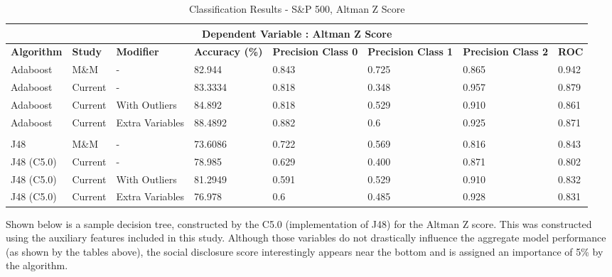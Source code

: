 \begin{table}[h]
\centering
\begin{sideways}%
\begin{tabular}{ |p{2.2cm}|p{1.55cm}|p{2.8cm}||p{2cm}|p{2cm}|p{2cm}|p{2cm}|p{1cm}|  }
 \hline
 \multicolumn{8}{|c|}{\bf Dependent Variable : Altman Z Score} \\
 \hline
{\bf Algorithm} & {\bf Study} & {\bf Modifier} & {\bf Accuracy (\%)} & {\bf Precision Class 0} & {\bf Precision Class 1} &{\bf  Precision Class 2} & {\bf ROC} \\
 \hline
  Adaboost  & M\&M  & - &  82.944     & 0.843 &  0.725 & 0.865 & 0.942  \\
  \rowcolor{gray}Adaboost & Current & - & 83.3334 & 0.818 & 0.348  & 0.957 & 0.879  \\
  Adaboost & Current & With Outliers & 84.892 & 0.818 & 0.529  & 0.910  & 0.861  \\
  \rowcolor{gray}Adaboost & Current & Extra Variables & 88.4892 & 0.882 & 0.6  & 0.925  & 0.871  \\

  & & & & & & &\\
 J48  & M\&M & - &73.6086  & 0.722 &  0.569 & 0.816 & 0.843  \\
 \rowcolor{gray}J48 (C5.0) & Current & - &78.985 & 0.629 & 0.400  & 0.871 &  0.802 \\
 J48 (C5.0) & Current & With Outliers &81.2949 & 0.591 & 0.529 & 0.910  &  0.832 \\
 \rowcolor{gray}J48 (C5.0) & Current & Extra Variables & 76.978  & 0.6 & 0.485 & 0.928  & 0.831   \\
 \hline
\end{tabular}
\end{sideways}
\caption{Classification Results  - S\&P 500, Altman Z Score}
\end{table}
\clearpage
{Shown below is a sample decision tree, constructed by the C5.0 (implementation of J48) for the Altman Z score. This was constructed using the auxiliary features included in this study. Although those variables do not drastically influence the aggregate model performance (as shown by the tables above), the social disclosure score interestingly appears near the bottom and is assigned an importance of 5\% by the algorithm. }\\
